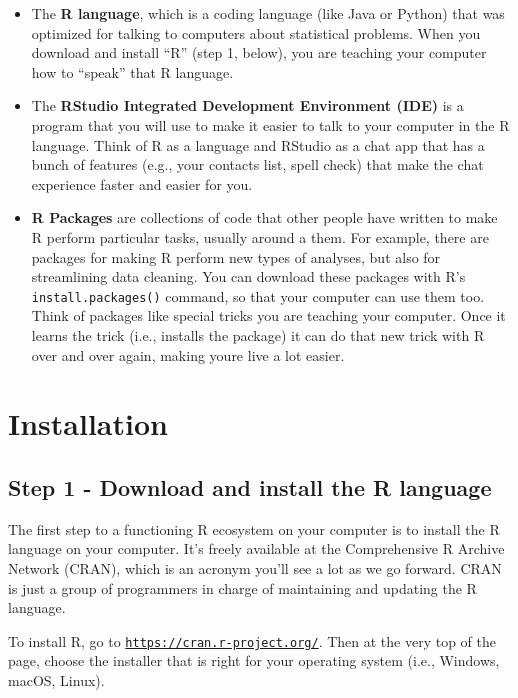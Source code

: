 \documentclass[
]{book}
\begin{document}
\begin{itemize}
\item
  The \textbf{R language}, which is a coding language (like Java or Python) that was optimized for talking to computers about statistical problems. When you download and install ``R'' (step 1, below), you are teaching your computer how to ``speak'' that R language.
\item
  The \textbf{RStudio Integrated Development Environment (IDE)} is a program that you will use to make it easier to talk to your computer in the R language. Think of R as a language and RStudio as a chat app that has a bunch of features (e.g., your contacts list, spell check) that make the chat experience faster and easier for you.
\item
  \textbf{R Packages} are collections of code that other people have written to make R perform particular tasks, usually around a them. For example, there are packages for making R perform new types of analyses, but also for streamlining data cleaning. You can download these packages with R's \texttt{install.packages()} command, so that your computer can use them too. Think of packages like special tricks you are teaching your computer. Once it learns the trick (i.e., installs the package) it can do that new trick with R over and over again, making youre live a lot easier.
\end{itemize}

\hypertarget{installation}{%
\section{Installation}\label{installation}}

\hypertarget{step-1---download-and-install-the-r-language}{%
\subsection{Step 1 - Download and install the R language}\label{step-1---download-and-install-the-r-language}}

The first step to a functioning R ecosystem on your computer is to install the R language on your computer. It's freely available at the Comprehensive R Archive Network (CRAN), which is an acronym you'll see a lot as we go forward. CRAN is just a group of programmers in charge of maintaining and updating the R language.

To install R, go to \href{https://cran.r-project.org/}{\texttt{https://cran.r-project.org/}}. Then at the very top of the page, choose the installer that is right for your operating system (i.e., Windows, macOS, Linux).
\end{document}
